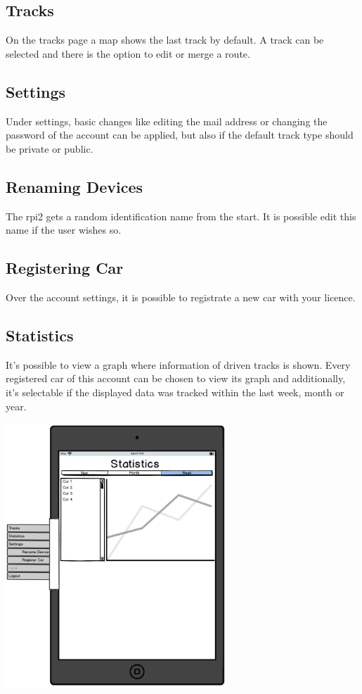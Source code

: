 \subsection{Tracks}
On the tracks page a map shows the last track by default. A track can be selected and there is the option to edit or merge a route.
\subsection{Settings}
Under settings, basic changes like editing the mail address or changing the password of the account can be applied, but also if the default track type should be private or public.
\subsection{Renaming Devices}
The \gls{rpi2} gets a random identification name from the start. It is possible edit this name if the user wishes so.
\subsection{Registering Car}
Over the account settings, it is possible to registrate a new car with your licence.
\subsection{Statistics}
It’s possible to view a graph where information of driven tracks is shown. Every registered car of this account can be chosen to view its graph and additionally, it’s selectable if the displayed data was tracked within the last week, month or year.
\begin{center}
\includegraphics[width=0.625\textwidth]{bilder/Tablet}
\end{center}
